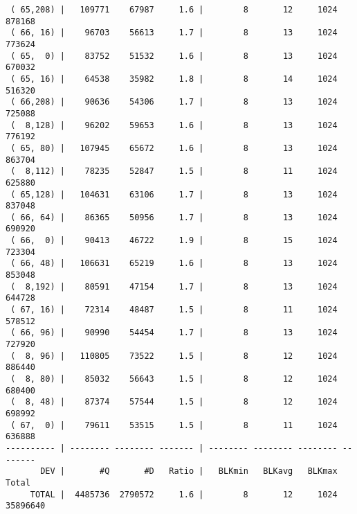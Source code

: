 \documentclass{article}
\begin{document}
\begin{verbatim}
 ( 65,208) |   109771    67987     1.6 |        8       12     1024   878168
 ( 66, 16) |    96703    56613     1.7 |        8       13     1024   773624
 ( 65,  0) |    83752    51532     1.6 |        8       13     1024   670032
 ( 65, 16) |    64538    35982     1.8 |        8       14     1024   516320
 ( 66,208) |    90636    54306     1.7 |        8       13     1024   725088
 (  8,128) |    96202    59653     1.6 |        8       13     1024   776192
 ( 65, 80) |   107945    65672     1.6 |        8       13     1024   863704
 (  8,112) |    78235    52847     1.5 |        8       11     1024   625880
 ( 65,128) |   104631    63106     1.7 |        8       13     1024   837048
 ( 66, 64) |    86365    50956     1.7 |        8       13     1024   690920
 ( 66,  0) |    90413    46722     1.9 |        8       15     1024   723304
 ( 66, 48) |   106631    65219     1.6 |        8       13     1024   853048
 (  8,192) |    80591    47154     1.7 |        8       13     1024   644728
 ( 67, 16) |    72314    48487     1.5 |        8       11     1024   578512
 ( 66, 96) |    90990    54454     1.7 |        8       13     1024   727920
 (  8, 96) |   110805    73522     1.5 |        8       12     1024   886440
 (  8, 80) |    85032    56643     1.5 |        8       12     1024   680400
 (  8, 48) |    87374    57544     1.5 |        8       12     1024   698992
 ( 67,  0) |    79611    53515     1.5 |        8       11     1024   636888
---------- | -------- -------- ------- | -------- -------- -------- --------
       DEV |       #Q       #D   Ratio |   BLKmin   BLKavg   BLKmax    Total
     TOTAL |  4485736  2790572     1.6 |        8       12     1024 35896640

\end{verbatim}
\end{document}
